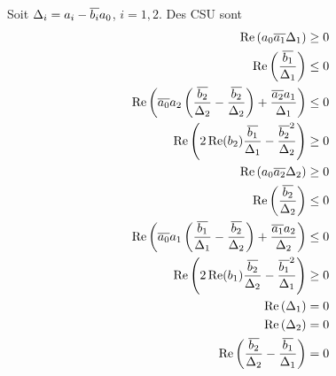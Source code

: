   \begin{prop}
    Soit \(\Delta_i = a_i-{\overline{b_i}}a_0\), \(i=1,2\). Des CSU sont
    \begin{align}
      \operatorname{Re}\left(a_0{\overline{a_1}}\Delta_1\right) \ge 0 \\
      \operatorname{Re}\left(\dfrac{{\overline{b_1}}}{\Delta_1}\right) \le 0 \\
      \operatorname{Re}\left({\overline{a_0}}a_2\left(\dfrac{{\overline{b_2}}}{\Delta_2}-\dfrac{{\overline{b_2}}}{\Delta_2}\right) + \dfrac{{\overline{a_2}}a_1}{\Delta_1} \right)\le 0\\
      \operatorname{Re}\left(2\operatorname{Re}(b_2)\dfrac{{\overline{b_1}}}{\Delta_1}-\dfrac{{\overline{b_2}}^2}{\Delta_2}\right) \ge 0\\
      \operatorname{Re}\left(a_0{\overline{a_2}}\Delta_2\right) \ge 0 \\
      \operatorname{Re}\left(\dfrac{{\overline{b_2}}}{\Delta_2}\right) \le 0 \\
      \operatorname{Re}\left({\overline{a_0}}a_1\left(\dfrac{{\overline{b_1}}}{\Delta_1}-\dfrac{{\overline{b_2}}}{\Delta_2}\right) + \dfrac{{\overline{a_1}}a_2}{\Delta_2} \right)\le 0\\
      \operatorname{Re}\left(2\operatorname{Re}(b_1)\dfrac{{\overline{b_2}}}{\Delta_2}-\dfrac{{\overline{b_1}}^2}{\Delta_1}\right) \ge 0\\
      \operatorname{Re}\left(\Delta_1\right) = 0 \\
      \operatorname{Re}\left(\Delta_2\right) = 0 \\
      \operatorname{Re}\left(\dfrac{{\overline{b_2}}}{\Delta_2}-\dfrac{{\overline{b_1}}}{\Delta_1}\right) = 0\\
    \end{align}
  \end{prop}
  
